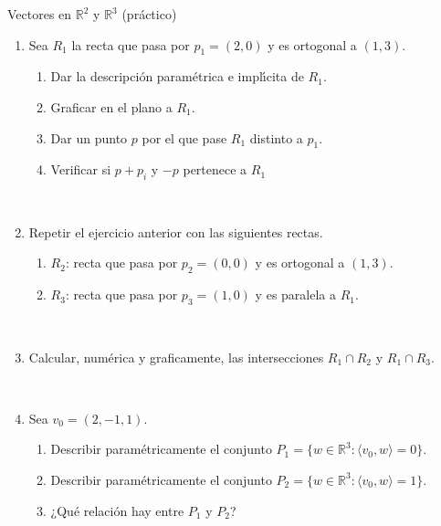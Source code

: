 \begin{chapter}{Vectores en $\mathbb R^2$ y $\mathbb R^3$ (práctico)}
\begin{enumerate}
\

\item Sea $R_1$ la recta que pasa por $p_1=(2,0)$ y es ortogonal a $(1,3)$.
\begin{enumerate}
 \item Dar la descripci\'on param{\'e}trica e impl{\'\i}cita de $R_1$.
 \item Graficar en el plano a $R_1$.
 \item Dar un punto $p$ por el que pase $R_1$ distinto a $p_1$.
 \item Verificar si $p+p_i$ y $-p$ pertenece a $R_1$
\end{enumerate}

\

\item Repetir el ejercicio anterior con las siguientes rectas.
\begin{enumerate}
	\item
	$R_2$: recta que pasa por $p_2=(0,0)$ y es ortogonal a $(1,3)$.
	\item
	$R_3$: recta que pasa por $p_3=(1,0)$ y es paralela a $R_1$.
\end{enumerate}

\

\item Calcular, num\'erica y graficamente, las intersecciones $R_1\cap R_2$ y $R_1\cap R_3$. 

\

\item Sea $v_0=(2,-1,1)$.
\begin{enumerate}
	\item Describir param{\'e}tricamente el conjunto
	$P_1=\{w\in\mathbb{ R}^3:\langle v_0 , w  \rangle=0\}$.
	\item Describir param{\'e}tricamente el conjunto
	$P_2=\{w\in\mathbb{ R}^3:\langle v_0 , w  \rangle=1\}$.
	\item ¿Qu\'e relaci\'on hay entre $P_1$ y $P_2$?
\end{enumerate}

\
\begin{comment}
\item Calcular.
\begin{enumerate}
	\item El {\'a}rea del tri{\'a}ngulo de v{\'e}rtices $(1,2)$, $(-1,2)$, $(2,4)$.
	\item El volumen del paralelep{\'\i}pedo definido por los vectores $(-2,3,1)$, $(1,1,2)$, $(1,2,3)$.
\end{enumerate}


\end{comment}
\end{enumerate}
\end{chapter}
